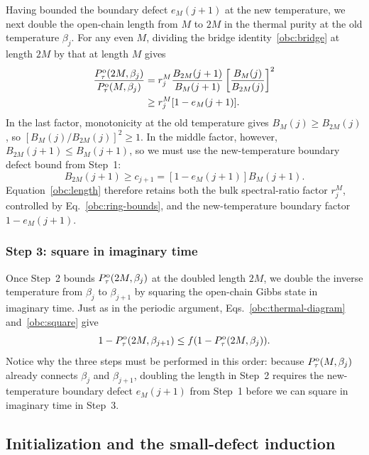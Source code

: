 Having bounded the boundary defect $e_M(j+1)$ at the new temperature, we next double the open-chain length from $M$ to $2M$ in the thermal purity at the old temperature $\beta_j$.
For any even $M$, dividing the bridge identity~\eqref{obc:bridge} at length $2M$ by that at length $M$ gives
\begin{align}
 \frac{P_{\tau}^{\mathrm{o}}(2M,\beta_j)}{P_{\tau}^{\mathrm{o}}(M,\beta_j)}
 &=r_j^M\frac{B_{2M}(j+1)}{B_M(j+1)}
   \left[\frac{B_M(j)}{B_{2M}(j)}\right]^2\notag \\
 &\ge r_j^M[1-e_M(j+1)].
 \label{obc:length}
\end{align}
In the last factor, monotonicity at the old temperature gives $B_M(j)\ge B_{2M}(j)$, so $[B_M(j)/B_{2M}(j)]^2\ge1$.
In the middle factor, however, $B_{2M}(j+1)\le B_M(j+1)$, so we must use the new-temperature boundary defect bound from Step~1:
\[
 B_{2M}(j+1)\ge c_{j+1}
 =[1-e_M(j+1)]B_M(j+1).
\]
Equation~\eqref{obc:length} therefore retains both the bulk spectral-ratio factor $r_j^M$, controlled by Eq.~\eqref{obc:ring-bounds}, and the new-temperature boundary factor
$1-e_M(j+1)$.

\subsubsection{Step 3: square in imaginary time}
\label{obc:move-three}

Once Step~2 bounds $P_{\tau}^{\mathrm{o}}(2M,\beta_j)$ at the doubled length $2M$, we double the inverse temperature from $\beta_j$ to $\beta_{j+1}$ by squaring the open-chain Gibbs state in imaginary time.
Just as in the periodic argument, Eqs.~\eqref{obc:thermal-diagram} and~\eqref{obc:square} give
\begin{equation}
 1-P_{\tau}^{\mathrm{o}}(2M,\beta_{j+1})
 \le f(1-P_{\tau}^{\mathrm{o}}(2M,\beta_j)).
 \label{obc:thermal-square}
\end{equation}
Notice why the three steps must be performed in this order: because $P_{\tau}^{\mathrm{o}}(M,\beta_j)$ already connects $\beta_j$ and $\beta_{j+1}$, doubling the length in Step~2 requires the new-temperature boundary defect $e_M(j+1)$ from Step~1 before we can square in imaginary time in Step~3.

\subsection{Initialization and the small-defect induction}
\label{obc:initialization}

